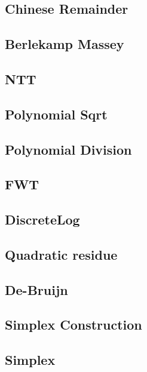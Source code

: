 \documentclass[a4paper,10pt,twocolumn,oneside]{article}
\begin{document}
\subsection{Chinese Remainder}

\subsection{Berlekamp Massey}

\subsection{NTT}

\subsection{Polynomial Sqrt}

\subsection{Polynomial Division}

\subsection{FWT}

\subsection{DiscreteLog}

\subsection{Quadratic residue}

\subsection{De-Bruijn}

\subsection{Simplex Construction}

\subsection{Simplex}

\end{document}

